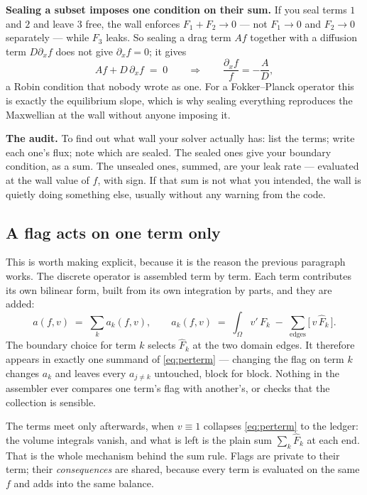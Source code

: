 \documentclass[11pt]{article}
\begin{document}
\textbf{Sealing a subset imposes one condition on their sum.} If you seal terms
$1$ and $2$ and leave $3$ free, the wall enforces $F_1+F_2 \to 0$ --- not
$F_1\to0$ and $F_2\to0$ separately --- while $F_3$ leaks. So sealing a drag term
$Af$ together with a diffusion term $D\partial_x f$ does not give $\partial_x f=0$;
it gives
\[
  A f + D\,\partial_x f \;=\; 0
  \qquad\Longrightarrow\qquad
  \frac{\partial_x f}{f} = -\frac{A}{D},
\]
a Robin condition that nobody wrote as one. For a Fokker--Planck operator this
is exactly the equilibrium slope, which is why sealing everything reproduces the
Maxwellian at the wall without anyone imposing it.

\textbf{The audit.} To find out what wall your solver actually has: list the
terms; write each one's flux; note which are sealed. The sealed ones give your
boundary condition, as a sum. The unsealed ones, summed, are your leak rate ---
evaluated at the wall value of $f$, with sign. If that sum is not what you
intended, the wall is quietly doing something else, usually without any warning
from the code.

\subsection*{A flag acts on one term only}

This is worth making explicit, because it is the reason the previous paragraph
works. The discrete operator is assembled term by term. Each term contributes
its own bilinear form, built from its own integration by parts, and they are
added:
\begin{equation}
  a(f,v) \;=\; \sum_k a_k(f,v),
  \qquad
  a_k(f,v) \;=\; \int_\Omega v'\,F_k \;-\; \sum_{\text{edges}} \big[\,v\,\widehat F_k\,\big].
  \label{eq:perterm}
\end{equation}
The boundary choice for term $k$ selects $\widehat F_k$ at the two domain edges.
It therefore appears in exactly one summand of \eqref{eq:perterm} --- changing
the flag on term $k$ changes $a_k$ and leaves every $a_{j\ne k}$ untouched, block
for block. Nothing in the assembler ever compares one term's flag with
another's, or checks that the collection is sensible.

The terms meet only afterwards, when $v\equiv1$ collapses \eqref{eq:perterm} to
the ledger: the volume integrals vanish, and what is left is the plain sum
$\sum_k \widehat F_k$ at each end. That is the whole mechanism behind the sum
rule. Flags are private to their term; their \emph{consequences} are shared,
because every term is evaluated on the same $f$ and adds into the same balance.
\end{document}
